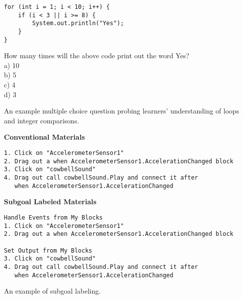 \documentclass[10pt,letterpaper]{article}
\begin{document}
\pagebreak

\begin{code}[h]
\begin{mdframed}
\begin{verbatim}
for (int i = 1; i < 10; i++) {
    if (i < 3 || i >= 8) {
        System.out.println("Yes");
    }
}
\end{verbatim}
How many times will the above code print out the word Yes?\\
a) 10\\
b) 5\\
c) 4\\
d) 3
\end{mdframed}
\caption{An example multiple choice question probing learners' understanding of loops and integer comparisons.}
\label{fig:mcq}
\end{code}

\begin{code}[h]
\begin{mdframed}
\noindent
\textbf{Conventional Materials}
\begin{verbatim}
1. Click on "AccelerometerSensor1"
2. Drag out a when AccelerometerSensor1.AccelerationChanged block
3. Click on "cowbellSound"
4. Drag out call cowbellSound.Play and connect it after
   when AccelerometerSensor1.AccelerationChanged
\end{verbatim}

\noindent
\textbf{Subgoal Labeled Materials}
\begin{verbatim}
Handle Events from My Blocks
1. Click on "AccelerometerSensor1"
2. Drag out a when AccelerometerSensor1.AccelerationChanged block

Set Output from My Blocks
3. Click on "cowbellSound"
4. Drag out call cowbellSound.Play and connect it after
   when AccelerometerSensor1.AccelerationChanged
\end{verbatim}
\end{mdframed}
\caption{An example of subgoal labeling.}
\label{fig:subgoal}
\end{code}


%
%
\end{document}
